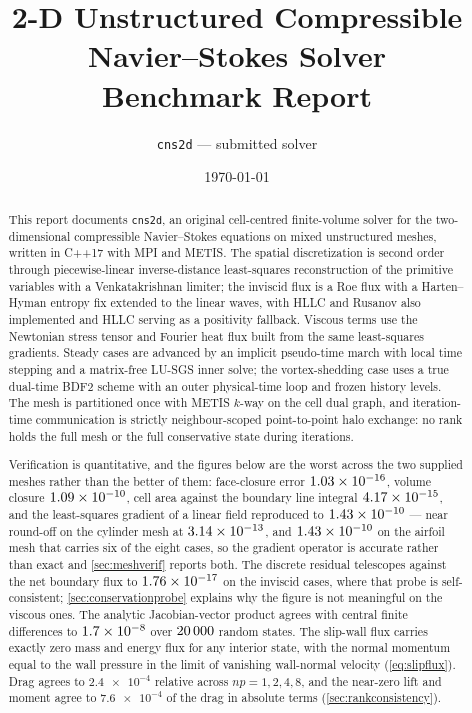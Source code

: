 \documentclass[11pt]{article}
\title{2-D Unstructured Compressible Navier--Stokes Solver\\Benchmark Report}
\author{\texttt{cns2d} --- submitted solver}
\date{\today}
\begin{document}
\maketitle

\begin{abstract}
This report documents \texttt{cns2d}, an original cell-centred finite-volume
solver for the two-dimensional compressible Navier--Stokes equations on mixed
unstructured meshes, written in C++17 with MPI and METIS. The spatial
discretization is second order through piecewise-linear inverse-distance
least-squares reconstruction of the primitive variables with a Venkatakrishnan
limiter; the inviscid flux is a Roe flux with a Harten--Hyman entropy fix
extended to the linear waves, with HLLC and Rusanov also implemented and HLLC
serving as a positivity fallback. Viscous terms use the Newtonian stress tensor
and Fourier heat flux built from the same least-squares gradients. Steady cases
are advanced by an implicit pseudo-time march with local time stepping and a
matrix-free LU-SGS inner solve; the vortex-shedding case uses a true dual-time
BDF2 scheme with an outer physical-time loop and frozen history levels. The mesh
is partitioned once with METIS $k$-way on the cell dual graph, and
iteration-time communication is strictly neighbour-scoped point-to-point halo
exchange: no rank holds the full mesh or the full conservative state during
iterations.

Verification is quantitative, and the figures below are the worst across the two
supplied meshes rather than the better of them: face-closure error
$\num{1.03e-16}$, volume closure $\num{1.09e-10}$, cell area against the
boundary line integral $\num{4.17e-15}$, and the least-squares gradient of a
linear field reproduced to $\num{1.43e-10}$ --- near round-off on the cylinder
mesh at $\num{3.14e-13}$, and $\num{1.43e-10}$ on the airfoil mesh that carries
six of the eight cases, so the gradient operator is accurate rather than exact and
\cref{sec:meshverif} reports both. The discrete residual telescopes against the net
boundary flux to $\num{1.76e-17}$ on the inviscid cases, where that probe
is self-consistent; \cref{sec:conservationprobe} explains why the figure is not
meaningful on the viscous ones. The analytic Jacobian-vector product agrees with central
finite differences to $1.7\times10^{-8}$ over $20\,000$ random states. The
slip-wall flux carries exactly zero mass and energy flux for any interior state, with the
normal momentum equal to the wall pressure in the limit of vanishing wall-normal velocity
(\cref{eq:slipflux}). Drag agrees to $\num{2.4e-4}$ relative across $np=1,2,4,8$, and the
near-zero lift and moment agree to $\num{7.6e-4}$ of the drag in absolute terms
(\cref{sec:rankconsistency}).


\end{abstract}
\end{document}
